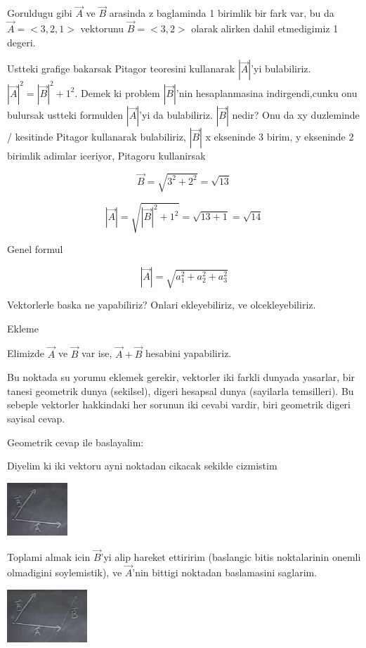 \documentclass[12pt,fleqn]{article}\usepackage{../common}
\begin{document}
Goruldugu gibi $\vec{A}$ ve $\vec{B}$ arasinda z baglaminda 1 birimlik bir
fark var, bu da $\vec{A} = <3,2,1>$ vektorunu $\vec{B}=<3,2>$ olarak
alirken dahil etmedigimiz 1 degeri.

Ustteki grafige bakarsak Pitagor teoresini kullanarak $|\vec{A}|$'yi
bulabiliriz. $|\vec{A}|^2 = |\vec{B}|^2 + 1^2$. Demek ki problem
$|\vec{B}|$'nin hesaplanmasina indirgendi,cunku onu bulursak ustteki
formulden $|\vec{A}|$'yi da bulabiliriz. $|\vec{B}|$ nedir? Onu da xy
duzleminde / kesitinde Pitagor kullanarak bulabiliriz, $|\vec{B}|$ x
ekseninde 3 birim, y ekseninde 2 birimlik adimlar iceriyor, Pitagoru
kullanirsak

\[  \vec{B} = \sqrt{3^2 + 2^2} = \sqrt{13} \]

\[ |\vec{A}| = \sqrt{|\vec{B}|^2 + 1^2} = \sqrt{13 + 1} = \sqrt{14} \]

Genel formul

\[ |\vec{A}| = \sqrt{a_1 ^2 + a_2^2 + a_3^2} \]

Vektorlerle baska ne yapabiliriz? Onlari ekleyebiliriz, ve
olcekleyebiliriz. 

Ekleme

Elimizde $\vec{A}$ ve $\vec{B}$ var ise, $\vec{A} + \vec{B}$ hesabini yapabiliriz. 

Bu noktada su yorumu eklemek gerekir, vektorler iki farkli dunyada
yasarlar, bir tanesi geometrik dunya (sekilsel), digeri hesapsal dunya
(sayilarla temsilleri). Bu sebeple vektorler hakkindaki her sorunun iki
cevabi vardir, biri geometrik digeri sayisal cevap.

Geometrik cevap ile baslayalim: 

Diyelim ki iki vektoru ayni noktadan cikacak sekilde cizmistim

\includegraphics[height=2cm]{1_6.png}

Toplami almak icin $\vec{B}$'yi alip hareket ettiririm (baslangic bitis
noktalarinin onemli olmadigini soylemistik), ve $\vec{A}$'nin bittigi
noktadan baslamasini saglarim.

\includegraphics[height=2cm]{1_7.png}
\end{document}
